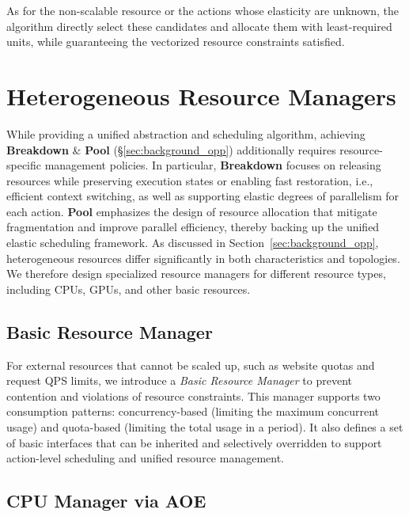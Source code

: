As for the non-scalable resource or the actions whose elasticity are unknown, the algorithm directly select these candidates and allocate them with least-required units, while guaranteeing the vectorized resource constraints satisfied.




\section{Heterogeneous Resource Managers}
\label{sec:design_resource_managing}

While providing a unified abstraction and scheduling algorithm, achieving \textbf{Breakdown} \& \textbf{Pool} (\S\ref{sec:background_opp}) additionally requires resource-specific management policies. 
In particular, \textbf{Breakdown} focuses on releasing resources while preserving execution states or enabling fast restoration, i.e., efficient context switching, as well as supporting elastic degrees of parallelism for each action.
\textbf{Pool} emphasizes the design of resource allocation that mitigate fragmentation and improve parallel efficiency, thereby backing up the unified elastic scheduling framework.
As discussed in Section~\ref{sec:background_opp}, heterogeneous resources differ significantly in both characteristics and topologies.
We therefore design specialized resource managers for different resource types, including CPUs, GPUs, and other basic resources.


\subsection{Basic Resource Manager}
For external resources that cannot be scaled up, such as website quotas and request QPS limits, we introduce a \emph{Basic Resource Manager} to prevent contention and violations of resource constraints.
This manager supports two consumption patterns: concurrency-based (limiting the maximum concurrent usage) and quota-based (limiting the total usage in a period).
It also defines a set of basic interfaces that can be inherited and selectively overridden to support action-level scheduling and unified resource management.

\subsection{CPU Manager via AOE}


